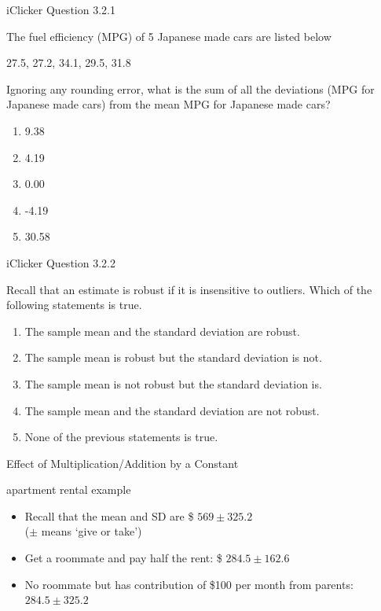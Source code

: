 \documentclass[14pt]{beamer}\usepackage[]{graphicx}\usepackage[]{color}
\begin{document}
\begin{frame}[fragile]{iClicker Question 3.2.1}

The fuel efficiency (MPG) of 5 Japanese made cars are listed below

27.5,	27.2,	34.1,	29.5,	31.8

Ignoring any rounding error, what is the sum of all the deviations (MPG  for Japanese made cars) from the mean MPG for Japanese made  cars?

\begin{enumerate}
\item 9.38
\item 4.19
\item 0.00
\item -4.19
\item 30.58
\end{enumerate}
\end{frame}

\begin{frame}[fragile]{iClicker Question 3.2.2}

Recall that an estimate is robust if it is insensitive to outliers. Which of  the following statements is true.

\begin{enumerate}
\item The sample mean and the standard deviation are robust.
\item The sample mean is robust but the standard deviation is  not.
\item The sample mean is not robust but the standard deviation  is.
\item The sample mean and the standard deviation are not  robust.
\item None of the previous statements is true.
\end{enumerate}
\end{frame}

\begin{frame}[fragile]{Effect of Multiplication/Addition by a Constant}



\begin{center}
apartment rental example
\end{center}

\begin{itemize}
\item<1-> Recall that the mean and SD are \$ $569 \pm 325.2$ \\ ($\pm$ means `give or take')
\item<2-> Get a roommate and pay half the rent: \$ $284.5 \pm 162.6$ %
\item<3-> No roommate but has contribution of \$100 per month from parents: $284.5 \pm 325.2$    %
\end{itemize}
\end{frame}
\end{document}
